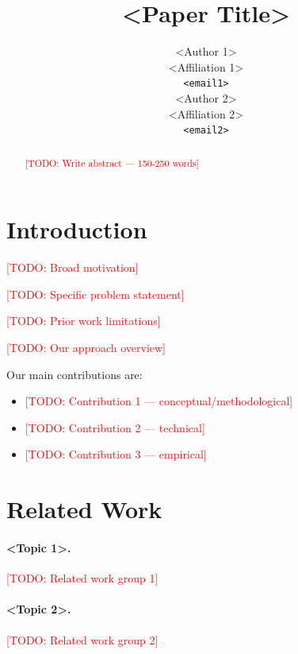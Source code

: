 \documentclass{article}
\title{<Paper Title>}
\author{
  <Author 1> \\
  <Affiliation 1> \\
  \texttt{<email1>} \\
  \And
  <Author 2> \\
  <Affiliation 2> \\
  \texttt{<email2>} \\
}
\newcommand{\todo}[1]{\textcolor{red}{[TODO: #1]}}
\begin{document}
\maketitle

\begin{abstract}
\todo{Write abstract — 150-250 words}
\end{abstract}

\section{Introduction}
\label{sec:intro}

\todo{Broad motivation}

\todo{Specific problem statement}

\todo{Prior work limitations}

\todo{Our approach overview}

Our main contributions are:
\begin{itemize}
    \item \todo{Contribution 1 — conceptual/methodological}
    \item \todo{Contribution 2 — technical}
    \item \todo{Contribution 3 — empirical}
\end{itemize}

\section{Related Work}
\label{sec:related}

\paragraph{<Topic 1>.}
\todo{Related work group 1}

\paragraph{<Topic 2>.}
\todo{Related work group 2}
\end{document}
